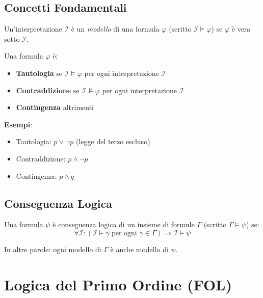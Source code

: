 \subsection{Concetti Fondamentali}

\begin{definizione}[Modello]
Un'interpretazione $\mathcal{I}$ è un \textit{modello} di una formula $\varphi$ (scritto $\mathcal{I} \models \varphi$) se $\varphi$ è vera sotto $\mathcal{I}$.
\end{definizione}

\begin{definizione}
Una formula $\varphi$ è:
\begin{itemize}
\item \textbf{Tautologia} se $\mathcal{I} \models \varphi$ per ogni interpretazione $\mathcal{I}$
\item \textbf{Contraddizione} se $\mathcal{I} \not\models \varphi$ per ogni interpretazione $\mathcal{I}$
\item \textbf{Contingenza} altrimenti
\end{itemize}
\end{definizione}

\textbf{Esempi}:
\begin{itemize}
\item Tautologia: $p \lor \neg p$ (legge del terzo escluso)
\item Contraddizione: $p \land \neg p$
\item Contingenza: $p \land q$
\end{itemize}

\subsection{Conseguenza Logica}

\begin{definizione}
Una formula $\psi$ è conseguenza logica di un insieme di formule $\Gamma$ (scritto $\Gamma \models \psi$) se:
\begin{equation}
\forall \mathcal{I}: (\mathcal{I} \models \gamma \text{ per ogni } \gamma \in \Gamma) \Rightarrow \mathcal{I} \models \psi
\end{equation}
\end{definizione}

In altre parole: ogni modello di $\Gamma$ è anche modello di $\psi$.

\section{Logica del Primo Ordine (FOL)}


